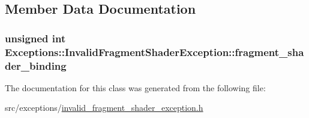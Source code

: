 \subsection{Member Data Documentation}
\hypertarget{class_exceptions_1_1_invalid_fragment_shader_exception_a3b2f1a947996d185b7a8a5c669ebbc74}{}
\subsubsection[{fragment\+\_\+shader\+\_\+binding}]{\setlength{\rightskip}{0pt plus 5cm}unsigned int Exceptions\+::\+Invalid\+Fragment\+Shader\+Exception\+::fragment\+\_\+shader\+\_\+binding\hspace{0.3cm}{\ttfamily [private]}}\label{class_exceptions_1_1_invalid_fragment_shader_exception_a3b2f1a947996d185b7a8a5c669ebbc74}


The documentation for this class was generated from the following file\+:\begin{DoxyCompactItemize}
\item 
src/exceptions/\hyperlink{invalid__fragment__shader__exception_8h}{invalid\+\_\+fragment\+\_\+shader\+\_\+exception.\+h}\end{DoxyCompactItemize}
